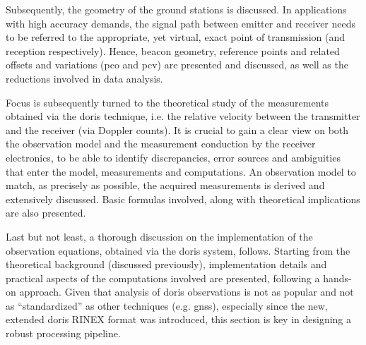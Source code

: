 Subsequently, the geometry of the ground stations is discussed. In applications  
with high accuracy demands, the signal path between emitter and receiver  
needs to be referred to the appropriate, yet virtual, exact point of transmission 
(and reception respectively). Hence, beacon geometry, reference points and related 
offsets and variations (\gls{pco} and \gls{pcv}) are presented and discussed, as 
well as the reductions involved in data analysis.

Focus is subsequently turned to the theoretical study of the measurements obtained via the 
\gls{doris} technique, i.e. the relative velocity between the transmitter and the 
receiver (via Doppler counts). It is crucial to gain a clear view on both the 
observation model and the measurement conduction by the receiver electronics, to 
be able to identify discrepancies, error sources and ambiguities that enter the model, 
measurements and computations. An observation model to match, as precisely as possible, 
the acquired measurements is derived and extensively discussed. Basic formulas 
involved, along with theoretical implications are also presented.

Last but not least, a thorough discussion on the implementation of the observation 
equations, obtained via the \gls{doris} system, follows. Starting from the theoretical 
background (discussed previously), implementation details and practical aspects of the 
computations involved are presented, following a hands-on approach. Given that analysis 
of \gls{doris} observations is not as popular and not as ``standardized'' as other 
techniques (e.g. \gls{gnss}), especially since the new, extended \gls{doris} RINEX 
format was introduced, this section is key in designing a robust processing pipeline.
